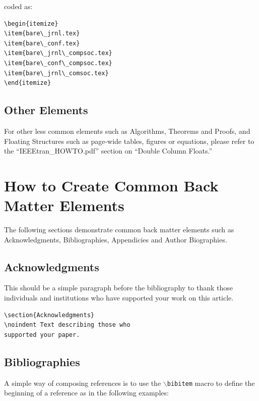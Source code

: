 \documentclass[lettersize,journal]{IEEEtran}
\begin{document}
\noindent coded as:

\begin{verbatim}
\begin{itemize}
\item{bare\_jrnl.tex}
\item{bare\_conf.tex}
\item{bare\_jrnl\_compsoc.tex}
\item{bare\_conf\_compsoc.tex}
\item{bare\_jrnl\_comsoc.tex}
\end{itemize}
\end{verbatim}


\subsection{Other Elements}
\noindent For other less common elements such as Algorithms, Theorems and Proofs, and Floating Structures such as page-wide tables, figures or equations, please refer to the ``IEEEtran\_HOWTO.pdf'' section on ``Double Column Floats.''


\section{How to Create Common Back Matter Elements}
\noindent The following sections demonstrate common back matter elements such as Acknowledgments, Bibliographies, Appendicies and Author Biographies.

\subsection{Acknowledgments}
\noindent This should be a simple paragraph before the bibliography to thank those individuals and institutions who have supported your work on this article.

\begin{verbatim}
\section{Acknowledgments}
\noindent Text describing those who 
supported your paper.
\end{verbatim}

\subsection{Bibliographies}
 A simple way of composing references is to use the $\backslash${\tt{bibitem}} macro to define the beginning of a reference as in the following examples:\\
\end{document}
